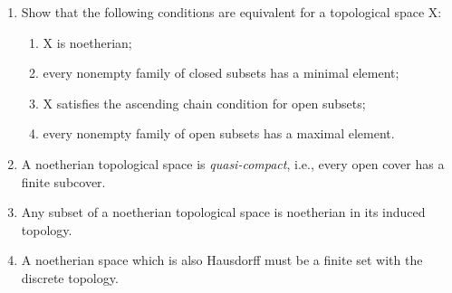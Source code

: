 \label{1.1.7}

\begin{enumerate}[label = (\alph*)]
    \item Show that the following conditions are equivalent for a topological space X:
    \begin{enumerate}[label = (\roman*)]
        \item X is noetherian;
        
        \item every nonempty family of closed subsets has a minimal element;
        
        \item X satisfies the ascending chain condition for open subsets;
        
        \item every nonempty family of open subsets has a maximal element.
    \end{enumerate}
    
    \item A noetherian topological space is \textit{quasi-compact}, i.e., every open cover has a finite subcover.
    
    \item Any subset of a noetherian topological space is noetherian in its induced topology.
    
    \item A noetherian space which is also Hausdorff must be a finite set with the discrete topology.
\end{enumerate}

